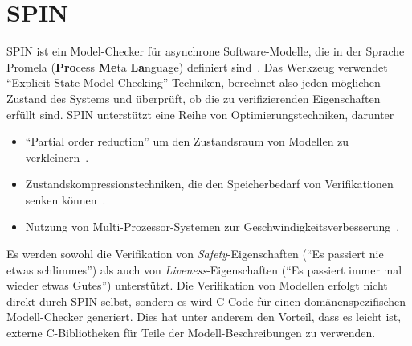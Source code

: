 \section{SPIN}
\label{sec:spin}
SPIN ist ein Model-Checker für asynchrone Software-Modelle, die in der Sprache Promela ({\bf Pro}cess {\bf Me}ta {\bf La}nguage) definiert sind~\cite{spinbook}.
Das Werkzeug verwendet "`Explicit-State Model Checking"'-Techniken, berechnet also jeden möglichen Zustand des Systems und überprüft, ob die zu verifizierenden Eigenschaften erfüllt sind.
SPIN unterstützt eine Reihe von Optimierungstechniken, darunter
\begin{itemize}
\item "`Partial order reduction"' um den Zustandsraum von Modellen zu verkleinern~\cite{partial_order_reduction}.
\item Zustandskompressionstechniken, die den Speicherbedarf von Verifikationen senken können~\cite{spin_state_compression}.
\item Nutzung von Multi-Prozessor-Systemen zur Geschwindigkeitsverbesserung~\cite{spin_multi_core}.
\end{itemize}
Es werden sowohl die Verifikation von \emph{Safety}-Eigenschaften ("`Es passiert nie etwas schlimmes"') als auch von \emph{Liveness}-Eigenschaften ("`Es passiert immer mal wieder etwas Gutes"') unterstützt.
Die Verifikation von Modellen erfolgt nicht direkt durch SPIN selbst, sondern es wird C-Code für einen domänenspezifischen Modell-Checker generiert.
Dies hat unter anderem den Vorteil, dass es leicht ist, externe C-Bibliotheken für Teile der Modell-Beschreibungen zu verwenden.